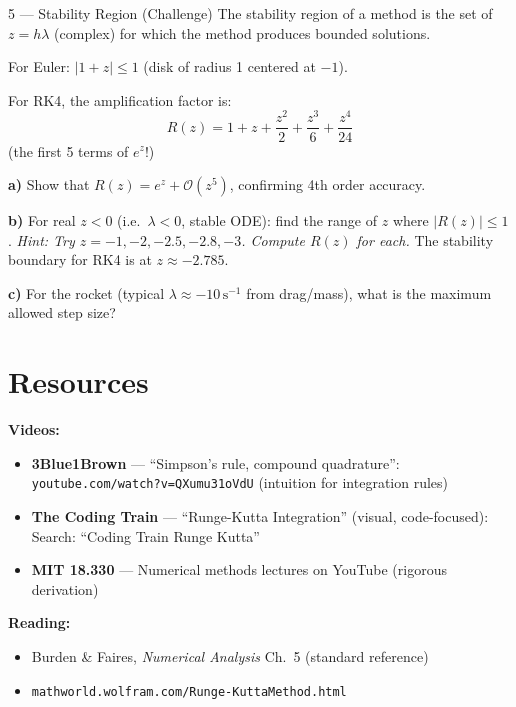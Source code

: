 \documentclass[12pt, a4paper]{article}
\begin{document}
\begin{exercisebox}{5 — Stability Region (Challenge)}
The stability region of a method is the set of $z = h\lambda$ (complex) for which the method produces bounded solutions.

For Euler: $|1 + z| \leq 1$ \; (disk of radius 1 centered at $-1$).

For RK4, the amplification factor is:
\[
  R(z) = 1 + z + \frac{z^2}{2} + \frac{z^3}{6} + \frac{z^4}{24}
\]
(the first 5 terms of $e^z$!)

\textbf{a)} Show that $R(z) = e^z + \mathcal{O}(z^5)$, confirming 4th order accuracy.

\textbf{b)} For real $z < 0$ (i.e.\ $\lambda < 0$, stable ODE): find the range of $z$ where $|R(z)| \leq 1$.
\textit{Hint: Try $z = -1, -2, -2.5, -2.8, -3$. Compute $R(z)$ for each.}
The stability boundary for RK4 is at $z \approx -2.785$.

\textbf{c)} For the rocket (typical $\lambda \approx -10\,\text{s}^{-1}$ from drag/mass), what is the maximum allowed step size?
\end{exercisebox}

\begin{solutionspace}[10cm]
\end{solutionspace}

\section{Resources}

\begin{hintbox}
\textbf{Videos:}
\begin{itemize}
  \item \textbf{3Blue1Brown} — ``Simpson's rule, compound quadrature'':\\
        \texttt{youtube.com/watch?v=QXumu31oVdU} (intuition for integration rules)
  \item \textbf{The Coding Train} — ``Runge-Kutta Integration'' (visual, code-focused):\\
        Search: ``Coding Train Runge Kutta''
  \item \textbf{MIT 18.330} — Numerical methods lectures on YouTube (rigorous derivation)
\end{itemize}
\textbf{Reading:}
\begin{itemize}
  \item Burden \& Faires, \textit{Numerical Analysis} Ch.~5 (standard reference)
  \item \texttt{mathworld.wolfram.com/Runge-KuttaMethod.html}
\end{itemize}
\end{hintbox}
\end{document}
